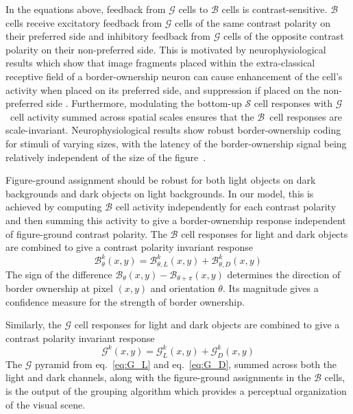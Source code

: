 \documentclass[12pt]{article}
\newcommand{\G}{\ensuremath{\mathcal{G}}}
\newcommand{\B}{\ensuremath{\mathcal{B}}}
\begin{document}
In the equations above, feedback from $\mathcal{G}$ cells to $\mathcal{B}$ cells is contrast-sensitive. $\mathcal{B}$ cells receive excitatory feedback from $\mathcal{G}$ cells of the same contrast polarity on their preferred side and inhibitory feedback from $\mathcal{G}$ cells of the opposite contrast polarity on their non-preferred side. This is motivated by neurophysiological results which show that image fragments placed within the extra-classical receptive field of a border-ownership neuron can cause enhancement of the
cell's activity when placed on its preferred side,
and suppression if placed on the non-preferred side
\citep{Zhang_vonderHeydt10}. Furthermore, modulating the bottom-up $\mathcal{S}$ cell
responses with \G\ cell activity summed across spatial scales
ensures that the \B\ cell responses are scale-invariant. Neurophysiological results show robust border-ownership coding for stimuli of varying sizes, with the latency of the border-ownership signal being relatively independent of the size of the figure~\citep{Zhou_etal00,Sugihara_etal11}.

Figure-ground assignment should be robust for both light objects on dark backgrounds and dark objects on light backgrounds. In our model, this is achieved by computing $\mathcal{B}$ cell activity
independently for each contrast polarity and then summing this activity to give
a border-ownership response independent of figure-ground contrast
polarity. The $\mathcal{B}$ cell responses for light and dark objects are combined to give a contrast polarity invariant response
\begin{equation}
\mathcal{B}^k_{\theta}(x,y) =
\mathcal{B}^k_{\theta,L}(x,y)+\mathcal{B}^k_{\theta,D}(x,y)
\label{eq:BOS}
\end{equation}
The sign of the difference $\mathcal{B}_{\theta}(x,y)-\mathcal{B}_{\theta+\pi}(x,y)$ determines the direction of border
ownership at pixel $(x,y)$ and orientation $\theta$. Its magnitude
gives a confidence measure for the strength of border ownership.

Similarly, the $\mathcal{G}$ cell responses for light and dark objects are combined to give a contrast polarity invariant response
\begin{equation}
\mathcal{G}^k(x,y) =
\mathcal{G}^k_{L}(x,y)+\mathcal{G}^k_{D}(x,y)
\label{eq:G}
\end{equation}
The $\G$ pyramid from eq.~\ref{eq:G_L} and eq.~\ref{eq:G_D}, summed across both the light and dark channels, along with the figure-ground assignments in the $\B$ cells, is the output of the grouping algorithm which provides a perceptual organization of the visual scene.
\end{document}
